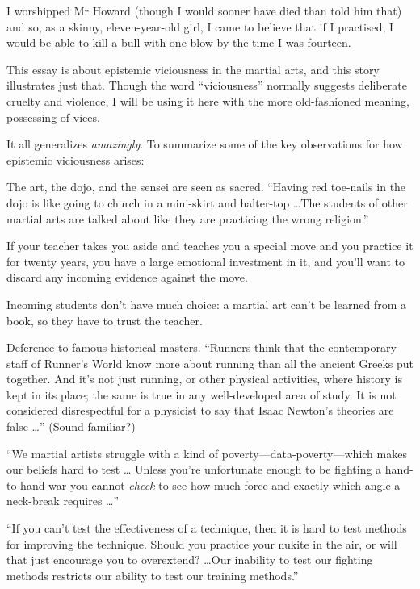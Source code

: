 {
 I worshipped Mr Howard (though I would sooner have died than told
him that) and so, as a skinny, eleven-year-old girl, I came to believe
that if I practised, I would be able to kill a bull with one blow by
the time I was fourteen.}

{
 This essay is about epistemic viciousness in the martial arts, and
this story illustrates just that. Though the word
``viciousness'' normally suggests
deliberate cruelty and violence, I will be using it here with the more
old-fashioned meaning, possessing of vices.}

{
 It all generalizes \textit{amazingly}. To summarize some of the
key observations for how epistemic viciousness arises:}

{
 The art, the dojo, and the sensei are seen as sacred.
``Having red toe-nails in the dojo is like going to
church in a mini-skirt and halter-top \ldots The students of other
martial arts are talked about like they are practicing the wrong
religion.''}

{
 If your teacher takes you aside and teaches you a special move and
you practice it for twenty years, you have a large emotional investment
in it, and you'll want to discard any incoming evidence
against the move.}

{
 Incoming students don't have much choice: a
martial art can't be learned from a book, so they have
to trust the teacher.}

{
 Deference to famous historical masters. ``Runners
think that the contemporary staff of Runner's World
know more about running than all the ancient Greeks put together. And
it's not just running, or other physical activities,
where history is kept in its place; the same is true in any
well-developed area of study. It is not considered disrespectful for a
physicist to say that Isaac Newton's theories are false
\ldots'' (Sound familiar?)}

{
 ``We martial artists struggle with a kind of
poverty---data-poverty---which makes our beliefs hard to test \ldots
Unless you're unfortunate enough to be fighting a
hand-to-hand war you cannot \textit{check} to see how much force and
exactly which angle a neck-break requires \ldots''}

{
 ``If you can't test the
effectiveness of a technique, then it is hard to test methods for
improving the technique. Should you practice your nukite in the air, or
will that just encourage you to overextend? \ldots Our inability to test
our fighting methods restricts our ability to test our training
methods.''}

